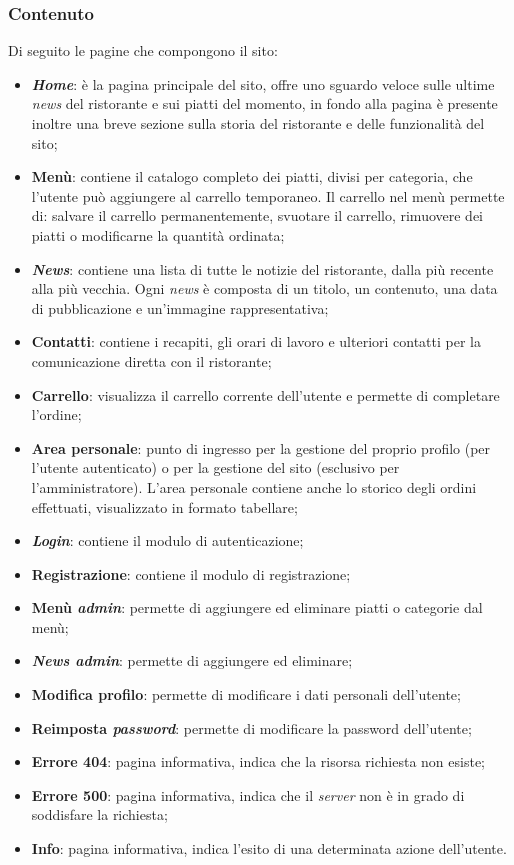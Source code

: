 \documentclass{template}
\begin{document}
	\subsubsection{Contenuto} \label{contenuto}
	Di seguito le pagine che compongono il sito:
	\begin{itemize}
		\item \textbf{\textit{Home}}: è la pagina principale del sito, offre uno sguardo veloce sulle ultime \textit{news} del ristorante e sui piatti del momento, in fondo alla pagina è presente inoltre una breve sezione sulla storia del ristorante e delle funzionalità del sito;
		\item \textbf{Menù}: contiene il catalogo completo dei piatti, divisi per categoria, che l'utente può aggiungere al carrello temporaneo. Il carrello nel menù permette di: salvare il carrello permanentemente, svuotare il carrello, rimuovere dei piatti o modificarne la quantità ordinata; 
		\item \textbf{\textit{News}}: contiene una lista di tutte le notizie del ristorante, dalla più recente alla più vecchia. Ogni \textit{news} è composta di un titolo, un contenuto, una data di pubblicazione e un'immagine rappresentativa;
		\item \textbf{Contatti}: contiene i recapiti, gli orari di lavoro e ulteriori contatti per la comunicazione diretta con il ristorante;
		\item \textbf{Carrello}: visualizza il carrello corrente dell'utente e permette di completare l'ordine;
		\item \textbf{Area personale}: punto di ingresso per la gestione del proprio profilo (per l'utente autenticato) o per la gestione del sito (esclusivo per l'amministratore). L'area personale contiene anche lo storico degli ordini effettuati, visualizzato in formato tabellare;
		\item \textbf{\textit{Login}}: contiene il modulo di autenticazione;
		\item \textbf{Registrazione}: contiene il modulo di registrazione;
		\item \textbf{Menù \textit{admin}}: permette di aggiungere ed eliminare piatti o categorie dal menù;
		\item \textbf{\textit{News admin}}: permette di aggiungere ed eliminare;
		\item \textbf{Modifica profilo}: permette di modificare i dati personali dell'utente;
		\item \textbf{Reimposta \textit{password}}: permette di modificare la password dell'utente;
		\item \textbf{Errore 404}: pagina informativa, indica che la risorsa richiesta non esiste;
		\item \textbf{Errore 500}: pagina informativa, indica che il \textit{server} non è in grado di soddisfare la richiesta;
		\item \textbf{Info}: pagina informativa, indica l'esito di una determinata azione dell'utente.
	\end{itemize}
	
\end{document}
